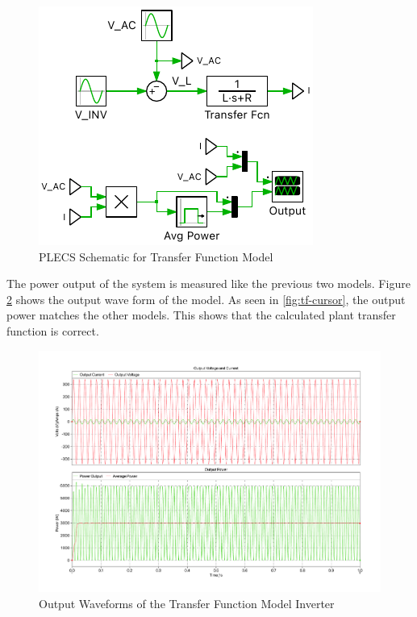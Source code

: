 \documentclass[12pt]{article}
\begin{document}
\begin{figure}[ht]
    \centering{}
    \includegraphics[width=\textwidth, height=0.4\textheight, keepaspectratio]{img/Transfer Function Model.pdf}
    \caption{PLECS Schematic for Transfer Function Model}
    \label{fig:tf-model}
\end{figure}

The power output of the system is measured like the previous two models.
Figure \ref{fig:tf-waveform} shows the output wave form of the model.
As seen in \ref{fig:tf-cursor}, the output power matches the other models.
This shows that the calculated plant transfer function is correct.

\begin{figure}[ht]
    \centering{}
    \includegraphics[width=\textwidth, height=0.4\textheight, keepaspectratio]{img/Transfer Function Power.pdf}
    \caption{Output Waveforms of the Transfer Function Model Inverter}
    \label{fig:tf-waveform}
\end{figure}
\end{document}
